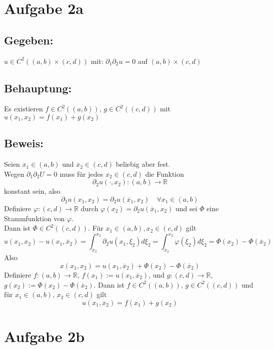 \documentclass[a4paper, 12pt]{article} %
\begin{document}
\begin{flushleft}
    \section*{Aufgabe 2a}

    \subsection*{Gegeben:}
    $u \in C^2((a,b) \times (c,d))$ mit: $\partial_1\partial_2u = 0$ auf $(a,b) \times (c,d)
    $

    \subsection*{Behauptung:}
    Es existieren $f \in C^2((a,b))$, $g \in C^2((c,d))$ mit $u(x_1,x_2) = f(x_1)+g(x_2)$

    \subsection*{Beweis:}
    Seien $\overline{x}_1 \in (a,b)$ und $\overline{x}_2 \in (c,d)$ beliebig aber fest. \\
    Wegen $\partial_1\partial_2U=0$ muss für jedes $x_2 \in (c,d)$ die Funktion
    $$
        \partial_2u(\cdot,x_2): (a,b) \rightarrow \mathbb{R}
    $$
    konstant sein, also
    $$
        \partial_2u(x_1,x_2) = \partial_2u(\overline{x}_1,x_2) \quad \forall x_1 \in (a,b)
    $$
    Definiere $\varphi:(c,d)\rightarrow \mathbb{R}$ durch $\varphi(x_2)=\partial_2u(\overline{x}_1,x_2)$ und sei $\Phi$ eine Stammfunktion von $\varphi$. \\
    Dann ist $\Phi \in C^2((c,d))$. Für $x_1 \in (a,b), x_2 \in (c,d)$ gilt
    $$
        u(x_1,x_2)-u(x_1,\overline{x}_2)
        = \int_{\overline{x}_2}^{x_2} \partial_2 u(x_1,\xi_2)d\xi_2
        = \int_{\overline{x}_2}^{x_2} \varphi(\xi_2)d\xi_2
        = \Phi(x_2)-\Phi(\overline{x}_2)
    $$
    Also
    $$
        x(x_1,x_2) = u(x_1,\overline{x}_2) + \Phi(x_2) - \Phi(\overline{x}_2)
    $$
    Definiere $f:(a,b)\rightarrow\mathbb{R}$, $f(x_1) := u(x_1,\overline{x}_2)$,
    und $g:(c,d)\rightarrow\mathbb{R}$, $g(x_2) := \Phi(x_2) - \Phi(\overline{x}_2)$.
    Dann ist $f \in C^2((a,b))$, $g \in C^2((c,d))$ und für $x_1 \in (a,b)$, $x_2 \in (c,d)$ gilt
    $$
        u(x_1,x_2)=f(x_1)+g(x_2)
    $$

    \QEDB


    \section*{Aufgabe 2b}


\end{flushleft}
\end{document}
